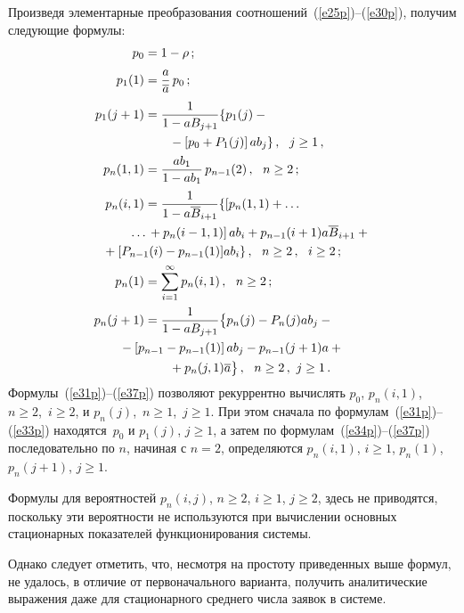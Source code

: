 \begin{multicols}{2}
Произведя  элементарные преобразования соотношений~(\ref{e25p})--(\ref{e30p}),
получим следующие формулы:
\begin{align}
p_0 &= 1-\rho\,; \label{e31p}\\
p_{1}(1) &=\fr{a}{\a}\, p_0\,;\label{e32p}\\
p_{1}(j+1) & = \fr{1}{1-aB_{j+1}}
 \{
p_{1}(j) -{}\notag\\
&\ \ \ \ \ \ {}- \left [ p_0 + P_{1}(j)\right ] ab_j
 \}\,,  \ \ j\ge 1\,,\label{e33p}\\
p_{n}(1,1) & = \fr{ab_1}{1 - ab_1}\, p_{n-1}(2)\,,
\ \ n\ge 2\,; \label{e34p}\\
p_{n}(i,1) & = \fr{1}{1 - a \overline B_{i+1}}
 \{
\left [p_n(1,1)+\ldots \right.\notag\\
&\!\!\!\!\!\!\!\!\left.\ldots {}+p_n(i-1,1)\right ] ab_i +
p_{n-1}(i+1) a \overline B_{i+1} +{}\notag\\
&\!\!\!\!\!\!\!\!\!\!\!\!\!\!\!\!\!\!\!\! {}+[P_{n-1}(i) - p_{n-1}(1)] a b_i  \}\,,
\ \ n\ge 2\,,\ \ i\ge 2\,; \label{e35p}\\
p_{n}(1) & = \sum\limits_{i=1}^\infty p_{n}(i,1)\,,
\ \ n\ge 2\,;                               \label{e36p}\\
p_n(j+1) & = \fr{1}{1 - aB_{j+1}}
\big\{
p_{n}(j) - P_n(j) a b_j - {}\notag\\
&\hspace*{-20pt}{}-\left [ p_{n-1} - p_{n-1}(1)\right ] a b_j -
p_{n-1}(j+1) a +{}\notag\\
&\hspace*{20pt}{}+ p_{n}(j,1) \a \big\}\,,\ \ 
n\ge 2\,,\  j\ge 1\,.                   \label{e37p}
\end{align}
Формулы~(\ref{e31p})--(\ref{e37p}) позволяют рекуррентно вы\-чис\-лять
$p_0$, $p_{n}(i,1)$,\  $n\ge 2$,\  $i\ge 2$, и
$p_n(j)$,\ $n\ge 1$,\ $j\ge 1$.
При этом сначала по формулам~(\ref{e31p})--(\ref{e33p}) 
находятся~$p_0$ и $p_{1}(j)$, $j\ge 1$,
а затем по формулам~(\ref{e34p})--(\ref{e37p}) последовательно по $n$,
начиная с $n=2$, определяются
$p_{n}(i,1)$, $i\ge 1$,
$p_{n}(1)$, $p_n(j+1)$, $j\ge 1$.

Формулы для вероятностей $p_{n}(i,j)$,
$n\ge 2$, $i\ge 1$, $j\ge 2$, здесь не
приводятся, поскольку эти вероятности не используются
при вычислении основных стационарных показателей
функционирования сис\-темы.

Однако следует отметить, что, несмотря на прос\-то\-ту
приведенных выше формул, не удалось, в от\-личие от
первоначального варианта, получить аналитические выражения
даже для стационарного среднего числа заявок в системе.


\end{multicols}
